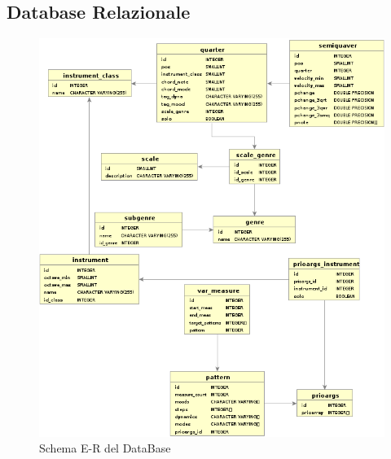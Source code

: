\subsection{Database Relazionale}
\begin{figure}[H]
\centering
\includegraphics[scale=0.7]{img/db.png}
\caption{Schema E-R del DataBase}
\end{figure}
